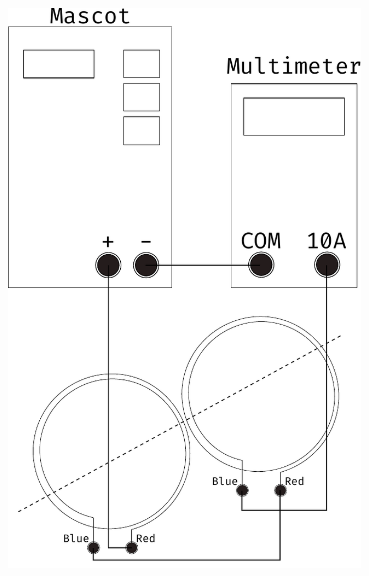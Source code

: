 \documentclass[../Elmag-labhefte-2020.tex]{subfiles}
\begin{document}
\begin{marginfigure}
  \centering
  \vspace{-6cm}
  \includegraphics[width=0.7\textwidth]{fig/circuit_double_coil}
        
        

\end{marginfigure}
\end{document}
